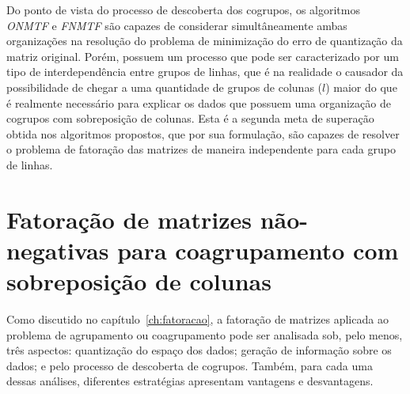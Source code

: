 \documentclass[
    12pt,                %
    oneside,            %
    a4paper,            %
    english,            %
    brazil                %
    ]{abntex2ppgsi}
\begin{document}
Do ponto de vista do processo de descoberta dos cogrupos, os algoritmos \textit{ONMTF} e \textit{FNMTF} são capazes de considerar simultâneamente ambas organizações na resolução do problema de minimização do erro de quantização da matriz original.
Porém, possuem um processo que pode ser caracterizado por um tipo de interdependência entre grupos de linhas, que é na realidade o causador da possibilidade de chegar a uma quantidade de grupos de colunas ($l$) maior do que é realmente necessário para explicar os dados que possuem uma organização de cogrupos com sobreposição de colunas.
Esta é a segunda meta de superação obtida nos algoritmos propostos, que por sua formulação, são capazes de resolver o problema de fatoração das matrizes de maneira independente para cada grupo de linhas.




\chapter{Fatoração de matrizes não-negativas para coagrupamento com sobreposição de colunas}
\label{ch:proposedalgs}

Como discutido no capítulo~\ref{ch:fatoracao}, a fatoração de matrizes aplicada ao problema de agrupamento ou coagrupamento pode ser analisada sob, pelo menos, três aspectos: quantização do espaço dos dados; geração de informação sobre os dados; e pelo processo de descoberta de cogrupos.
Também, para cada uma dessas análises, diferentes estratégias apresentam vantagens e desvantagens.
\end{document}
